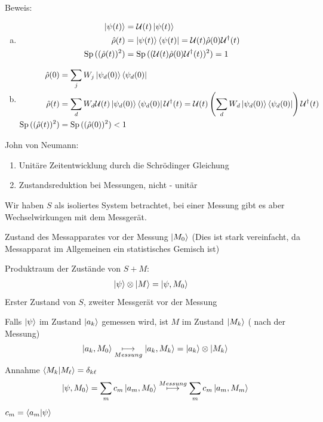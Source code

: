 	Beweis: 
		\begin{enumerate}[(a)]
			\item \begin{align*}
				\ket{\psi (t)} &= \mathcal{U} (t) \ket{\psi(t)} \\
				\hat{\rho}(t) &= \ket{\psi(t)} \bra{\psi (t)} = 
				\mathcal{U} (t) \hat{\rho}(0) \mathcal{U}^\dagger (t) \\
				\mathrm{Sp}\, ((\hat{\rho}(t))^2) &= 
				\mathrm{Sp}\, ((\mathcal{U} (t) \hat{\rho} (0) \mathcal{U}^\dagger(t))^2) = 1 
			\end{align*}
			\item \begin{align*}
				\hat{\rho}(0) &= \sum_j W_j \ket{\psi_d (0)} \bra{\psi_d (0)} \\
				\hat{\rho}(t) &= \sum_d W_d \mathcal{U} (t) \ket{\psi_d (0)} \bra{\psi_d (0)}
				\mathcal{U}^\dagger(t) =
				\mathcal{U}(t) \left(
					\sum_d W_d \ket{\psi_d (0)} \bra{\psi_d (0)}
				\right) \mathcal{U}^\dagger(t) \\
				\mathrm{Sp}\, ((\hat{\rho}(t))^2) &= 
				\mathrm{Sp}\, ((\hat{\rho}(0))^2) < 1
 			\end{align*}
		\end{enumerate}
	John von Neumann:
		\begin{enumerate}[1.]
			\item Unitäre Zeitentwicklung durch die Schrödinger Gleichung
			\item Zustandsreduktion bei Messungen, nicht - unitär
		\end{enumerate}
	Wir haben $S$ als isoliertes System betrachtet, bei einer Messung gibt es aber Wechselwirkungen mit dem Messgerät.
	
	Zustand des Messapparates vor der Messung $\ket{M_0}$ 
	(Dies ist stark vereinfacht, da Messapparat im Allgemeinen ein statistisches Gemisch ist)
	
	Produktraum der Zustände von $S + M$:
		\begin{align*}
			\ket{\psi} \otimes \ket{M} &= \ket{\psi, M_0}
		\end{align*}
	Erster Zustand von $S$, zweiter Messgerät vor der Messung
	
	Falls $\ket{\psi}$ im Zustand $\ket{a_k}$ gemessen wird, ist $M$ im Zustand $\ket{M_k}$ ( nach der Messung) 
		\begin{align*}
			\ket{a_k, M_0} \underset{Messung}{\longmapsto} \ket{a_k, M_k}
			= \ket{a_k} \otimes \ket{M_k}
		\end{align*}
	Annahme $\braket{M_k | M_\ell} = \delta_{k\ell}$
		\begin{align*}
			\ket{\psi, M_0} = \sum_m c_m \ket{a_m, M_0} \overset{Messung}{\longmapsto}
			\sum_m c_m \ket{a_m, M_m}
		\end{align*}
	$c_m = \braket{a_m | \psi}$
	
